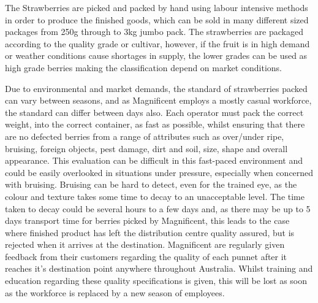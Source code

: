 \documentclass[fleqn,twoside]{article}
\begin{document}
The Strawberries are picked and packed by hand using labour intensive methods in order to produce the finished goods, which can be sold in many different sized packages from 250g through to 3kg jumbo pack. The strawberries are packaged according to the quality grade or cultivar, however, if the fruit is in high demand or weather conditions cause shortages in supply, the lower grades can be used as high grade berries making the classification depend on market conditions.

Due to environmental and market demands, the standard of strawberries packed can vary between seasons, and as Magnificent employs a mostly casual workforce, the standard can differ between days also. Each operator must pack the correct weight, into the correct container, as fast as possible, whilst ensuring that there are no defected berries from a range of attributes such as over/under ripe, bruising, foreign objects, pest damage, dirt and soil, size, shape and overall appearance. This evaluation can be difficult in this fast-paced environment and could be easily overlooked in situations under pressure, especially when concerned with bruising. Bruising can be hard to detect, even for the trained eye, as the colour and texture takes some time to decay to an unacceptable level. The time taken to decay could be several hours to a few days and, as there may be up to 5 days transport time for berries picked by Magnificent, this leads to the case where finished product has left the distribution centre quality assured, but is rejected when it arrives at the destination. Magnificent are regularly given feedback from their customers regarding the quality of each punnet after it reaches it's destination point anywhere throughout Australia. Whilst training and education regarding these quality specifications is given, this will be lost as soon as the workforce is replaced by a new season of employees.  
\end{document}
